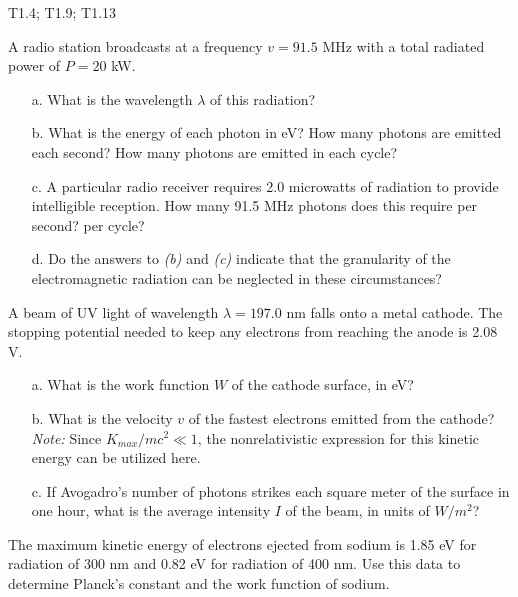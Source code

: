 \documentclass[11pt,letterpaper,boxed, noheader]{pset}
\begin{document}
    \begin{center}
        T1.4; T1.9; T1.13
    \end{center}
    
    \begin{problem} [T1.4]
        A radio station broadcasts at a frequency $v = 91.5$ MHz with a total radiated power of $P = 20$ kW. 
        
        \begin{enumerate}
            \item [a.] What is the wavelength $\lambda$ of this radiation?
            \item [b.] What is the energy of each photon in eV? How many photons are emitted each second? How many photons are emitted in each cycle?
            \item [c.] A particular radio receiver requires 2.0 microwatts of radiation to provide intelligible reception. How many 91.5 MHz photons does this require per second? per cycle?
            \item [d.] Do the answers to \textit{(b)} and \textit{(c)} indicate that the granularity of the electromagnetic radiation can be neglected in these circumstances?
        \end{enumerate}
    \end{problem}
    \newpage
    
    \begin{problem} [T1.9]
        A beam of UV light of wavelength $\lambda = 197.0$ nm falls onto a metal cathode. The stopping potential needed to keep any electrons from reaching the anode is 2.08 V. 
        
        \begin{enumerate}
            \item [a.] What is the work function $W$ of the cathode surface, in eV?
            \item [b.] What is the velocity $v$ of the fastest electrons emitted from the cathode? \textit{Note:} Since $K_{max}/mc^2 \ll 1$, the nonrelativistic expression for this kinetic energy can be utilized here.
            \item [c.] If Avogadro's number of photons strikes each square meter of the surface in one hour, what is the average intensity $I$ of the beam, in units of $W/m^2$?
        \end{enumerate}
    \end{problem}
    \newpage
    
    \begin{problem} [T1.13]
        The maximum kinetic energy of electrons ejected from sodium is 1.85 eV for radiation of 300 nm and 0.82 eV for radiation of 400 nm. Use this data to determine Planck's constant and the work function of sodium.
    \end{problem}
\end{document}
